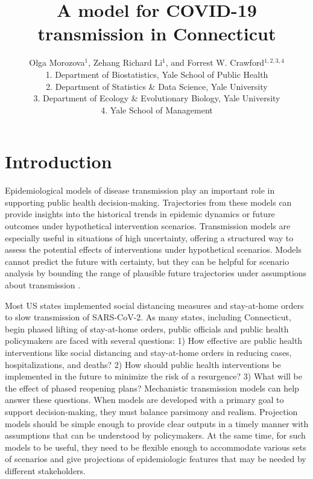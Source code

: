 \documentclass[11pt]{article}
\title{A model for COVID-19 transmission in Connecticut}
\author{Olga Morozova$^{1}$,
  Zehang Richard Li$^1$,
and Forrest W. Crawford$^{1,2,3,4}$  \\[1em]
\small 1. Department of Biostatistics, Yale School of Public Health \\
\small 2. Department of Statistics \& Data Science, Yale University \\
\small 3. Department of Ecology \& Evolutionary Biology, Yale University \\
\small 4. Yale School of Management }
\begin{document}
\maketitle




\section{Introduction}


Epidemiological models of disease transmission play an important role in supporting public health decision-making. Trajectories from these models can provide insights into the historical trends in epidemic dynamics or future outcomes under hypothetical intervention scenarios. 
Transmission models are especially useful in situations of high uncertainty, offering a structured way to assess the potential effects of interventions under hypothetical scenarios.  Models cannot predict the future with certainty, but they can be helpful for scenario analysis by bounding the range of plausible future trajectories under assumptions about transmission \citep{holmdahl2020wrong}. 

Most US states implemented social distancing measures and stay-at-home orders to slow transmission of SARS-CoV-2. 
As many states, including Connecticut, begin phased lifting of stay-at-home orders, public officials and public health policymakers are faced with several questions: 1) How effective are public health interventions like social distancing and stay-at-home orders in reducing cases, hospitalizations, and deaths? 2)  How should public health interventions be implemented in the future to minimize the risk of a resurgence? 3) What will be the effect of phased reopening plans?  Mechanistic transmission models can help answer these questions. When models are developed with a primary goal to support decision-making, they must balance parsimony and realism. Projection models should be simple enough to provide clear outputs in a timely manner with assumptions that can be understood by policymakers. At the same time, for such models to be useful, they need to be flexible enough to accommodate various sets of scenarios and give projections of epidemiologic features that may be needed by different stakeholders. 
\end{document}
